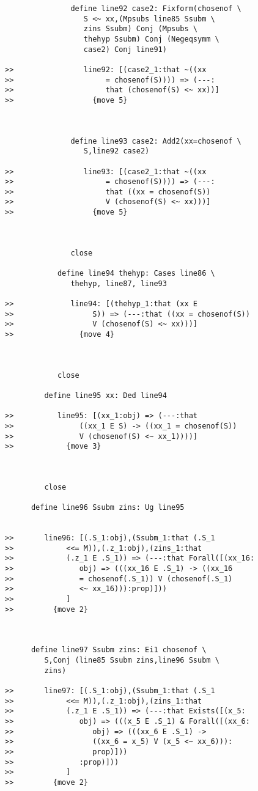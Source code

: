 \documentclass[12pt]{article}
\begin{document}
\begin{verbatim}
               define line92 case2: Fixform(chosenof \
                  S <~ xx,(Mpsubs line85 Ssubm \
                  zins Ssubm) Conj (Mpsubs \
                  thehyp Ssubm) Conj (Negeqsymm \
                  case2) Conj line91)

>>                line92: [(case2_1:that ~((xx
>>                     = chosenof(S)))) => (---:
>>                     that (chosenof(S) <~ xx))]
>>                  {move 5}



               define line93 case2: Add2(xx=chosenof \
                  S,line92 case2)

>>                line93: [(case2_1:that ~((xx
>>                     = chosenof(S)))) => (---:
>>                     that ((xx = chosenof(S))
>>                     V (chosenof(S) <~ xx)))]
>>                  {move 5}



               close

            define line94 thehyp: Cases line86 \
               thehyp, line87, line93

>>             line94: [(thehyp_1:that (xx E
>>                  S)) => (---:that ((xx = chosenof(S))
>>                  V (chosenof(S) <~ xx)))]
>>               {move 4}



            close

         define line95 xx: Ded line94

>>          line95: [(xx_1:obj) => (---:that
>>               ((xx_1 E S) -> ((xx_1 = chosenof(S))
>>               V (chosenof(S) <~ xx_1))))]
>>            {move 3}



         close

      define line96 Ssubm zins: Ug line95


>>       line96: [(.S_1:obj),(Ssubm_1:that (.S_1
>>            <<= M)),(.z_1:obj),(zins_1:that
>>            (.z_1 E .S_1)) => (---:that Forall([(xx_16:
>>               obj) => (((xx_16 E .S_1) -> ((xx_16
>>               = chosenof(.S_1)) V (chosenof(.S_1)
>>               <~ xx_16))):prop)]))
>>            ]
>>         {move 2}



      define line97 Ssubm zins: Ei1 chosenof \
         S,Conj (line85 Ssubm zins,line96 Ssubm \
         zins)

>>       line97: [(.S_1:obj),(Ssubm_1:that (.S_1
>>            <<= M)),(.z_1:obj),(zins_1:that
>>            (.z_1 E .S_1)) => (---:that Exists([(x_5:
>>               obj) => (((x_5 E .S_1) & Forall([(xx_6:
>>                  obj) => (((xx_6 E .S_1) ->
>>                  ((xx_6 = x_5) V (x_5 <~ xx_6))):
>>                  prop)]))
>>               :prop)]))
>>            ]
>>         {move 2}




\end{verbatim}
\end{document}
